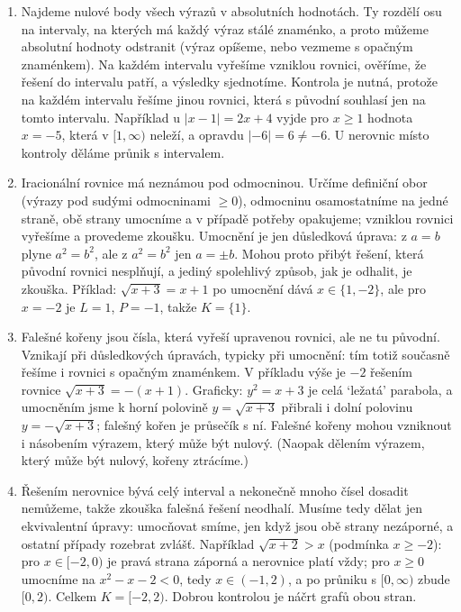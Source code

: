\begin{enumerate}[label=\textbf{\arabic*.}, leftmargin=*, itemsep=0.8em]
  \item {}
  Najdeme nulové body všech výrazů v absolutních hodnotách. Ty rozdělí osu na intervaly, na kterých má každý výraz stálé znaménko, a proto můžeme absolutní hodnoty odstranit (výraz opíšeme, nebo vezmeme s opačným znaménkem). Na každém intervalu vyřešíme vzniklou rovnici, ověříme, že řešení do intervalu patří, a výsledky sjednotíme. Kontrola je nutná, protože na každém intervalu řešíme jinou rovnici, která s původní souhlasí jen na tomto intervalu. Například u $|x - 1| = 2x + 4$ vyjde pro $x\geq 1$ hodnota $x = -5$, která v $[1, \infty)$ neleží, a opravdu $|-6| = 6\neq -6$. U nerovnic místo kontroly děláme průnik s intervalem. 

  \item {}
  Iracionální rovnice má neznámou pod odmocninou. Určíme definiční obor (výrazy pod sudými odmocninami $\geq 0$), odmocninu osamostatníme na jedné straně, obě strany umocníme a v případě potřeby opakujeme; vzniklou rovnici vyřešíme a provedeme zkoušku. Umocnění je jen důsledková úprava: z $a = b$ plyne $a^2 = b^2$, ale z $a^2 = b^2$ jen $a = \pm b$. Mohou proto přibýt řešení, která původní rovnici nesplňují, a jediný spolehlivý způsob, jak je odhalit, je zkouška. Příklad: $\sqrt{x + 3} = x + 1$ po umocnění dává $x\in\{1, -2\}$, ale pro $x = -2$ je $L = 1$, $P = -1$, takže $K = \{1\}$. 

  \item {}
  Falešné kořeny jsou čísla, která vyřeší upravenou rovnici, ale ne tu původní. Vznikají při důsledkových úpravách, typicky při umocnění: tím totiž současně řešíme i rovnici s opačným znaménkem. V příkladu výše je $-2$ řešením rovnice $\sqrt{x + 3} = -(x + 1)$. Graficky: $y^2 = x + 3$ je celá `ležatá' parabola, a umocněním jsme k horní polovině $y = \sqrt{x + 3}$ přibrali i dolní polovinu $y = -\sqrt{x + 3}$; falešný kořen je průsečík s ní. Falešné kořeny mohou vzniknout i násobením výrazem, který může být nulový. (Naopak dělením výrazem, který může být nulový, kořeny ztrácíme.)

  \item {}
  Řešením nerovnice bývá celý interval a nekonečně mnoho čísel dosadit nemůžeme, takže zkouška falešná řešení neodhalí. Musíme tedy dělat jen ekvivalentní úpravy: umocňovat smíme, jen když jsou obě strany nezáporné, a ostatní případy rozebrat zvlášť. Například $\sqrt{x + 2} > x$ (podmínka $x\geq -2$): pro $x\in[-2, 0)$ je pravá strana záporná a nerovnice platí vždy; pro $x\geq 0$ umocníme na $x^2 - x - 2 < 0$, tedy $x\in(-1, 2)$, a po průniku s $[0, \infty)$ zbude $[0, 2)$. Celkem $K = [-2, 2)$. Dobrou kontrolou je náčrt grafů obou stran. 
\end{enumerate}

